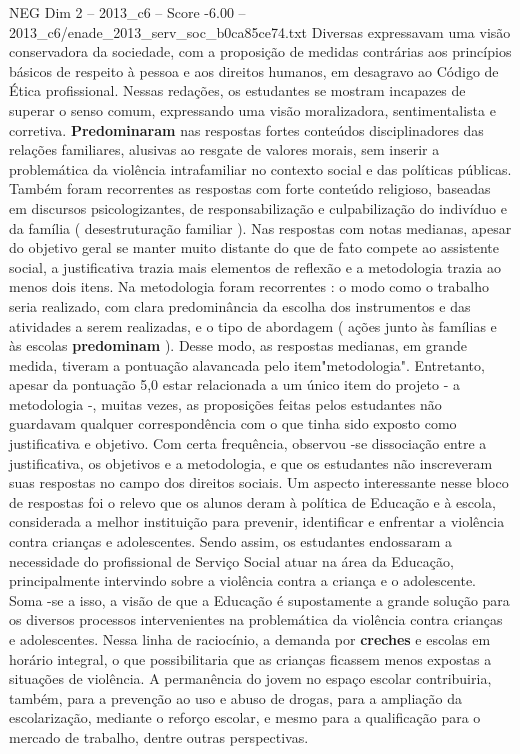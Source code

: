 \begin{textsample}{NEG Dim 2 – 2013\_c6 – Score -6.00 – 2013\_c6/enade\_2013\_serv\_soc\_b0ca85ce74.txt}
Diversas expressavam uma visão conservadora da sociedade, com a proposição de medidas contrárias aos princípios básicos de respeito à pessoa e aos direitos humanos, em desagravo ao Código de Ética profissional.
Nessas redações, os estudantes se mostram incapazes de superar o senso comum, expressando uma visão moralizadora, sentimentalista e corretiva. \textbf{Predominaram} nas respostas fortes conteúdos disciplinadores das relações familiares, alusivas ao resgate de valores morais, sem inserir a problemática da violência intrafamiliar no contexto social e das políticas públicas.
Também foram recorrentes as respostas com forte conteúdo religioso, baseadas em discursos psicologizantes, de responsabilização e culpabilização do indivíduo e da família ( desestruturação familiar ).
Nas respostas com notas medianas, apesar do objetivo geral se manter muito distante do que de fato compete ao assistente social, a justificativa trazia mais elementos de reflexão e a metodologia trazia ao menos dois itens.
Na metodologia foram recorrentes : o modo como o trabalho seria realizado, com clara predominância da escolha dos instrumentos e das atividades a serem realizadas, e o tipo de abordagem ( ações junto às famílias e às escolas \textbf{predominam} ).
Desse modo, as respostas medianas, em grande medida, tiveram a pontuação alavancada pelo item"metodologia".
Entretanto, apesar da pontuação 5,0 estar relacionada a um único item do projeto - a metodologia -, muitas vezes, as proposições feitas pelos estudantes não guardavam qualquer correspondência com o que tinha sido exposto como justificativa e objetivo.
Com certa frequência, observou -se dissociação entre a justificativa, os objetivos e a metodologia, e que os estudantes não inscreveram suas respostas no campo dos direitos sociais.
Um aspecto interessante nesse bloco de respostas foi o relevo que os alunos deram à política de Educação e à escola, considerada a melhor instituição para prevenir, identificar e enfrentar a violência contra crianças e adolescentes.
Sendo assim, os estudantes endossaram a necessidade do profissional de Serviço Social atuar na área da Educação, principalmente intervindo sobre a violência contra a criança e o adolescente.
Soma -se a isso, a visão de que a Educação é supostamente a grande solução para os diversos processos intervenientes na problemática da violência contra crianças e adolescentes.
Nessa linha de raciocínio, a demanda por \textbf{creches} e escolas em horário integral, o que possibilitaria que as crianças ficassem menos expostas a situações de violência.
A permanência do jovem no espaço escolar contribuiria, também, para a prevenção ao uso e abuso de drogas, para a ampliação da escolarização, mediante o reforço escolar, e mesmo para a qualificação para o mercado de trabalho, dentre outras perspectivas.

\end{textsample}
